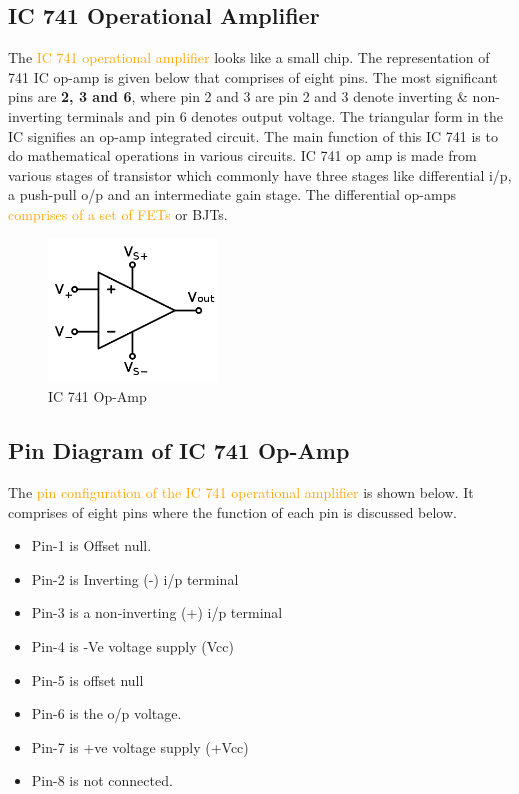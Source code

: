 \documentclass[11pt,a4paper,oneside]{article}
\begin{document}
	\subsection{IC 741 Operational Amplifier}

	The \textcolor{orange}{IC 741 operational amplifier} looks like a small chip. The representation of 741 IC op-amp is given below that comprises of eight pins. The most significant pins are \textbf{2, 3 and 6}, where pin 2 and 3 are pin 2 and 3 denote inverting \& non-inverting terminals and pin 6 denotes output voltage. The triangular form in the IC signifies an op-amp integrated circuit. The main function of this IC 741 is to do mathematical operations in various circuits. IC 741 op amp is made from various stages of transistor which commonly have three stages like differential i/p, a push-pull o/p and an intermediate gain stage. The differential op-amps \textcolor{orange}{comprises of a set of FETs} or BJTs.

	\begin{figure}[hbt!]
		\centering
		\includegraphics[width=0.4\textwidth]{images/op-amp_circuit_diagram.png}
		\caption{IC 741 Op-Amp}
	\end{figure}

	\subsection{Pin Diagram of IC 741 Op-Amp}

	The \textcolor{orange}{pin configuration of the IC 741 operational amplifier} is shown below. It comprises of eight pins where the function of each pin is discussed below.

	\begin{itemize}
		\item Pin-1 is Offset null.
		\item Pin-2 is Inverting (-) i/p terminal
		\item Pin-3 is a non-inverting (+) i/p terminal
		\item Pin-4 is -Ve voltage supply (Vcc)
		\item Pin-5 is offset null
		\item Pin-6 is the o/p voltage.
		\item Pin-7 is +ve voltage supply (+Vcc)
		\item Pin-8 is not connected.
	\end{itemize}
\end{document}
